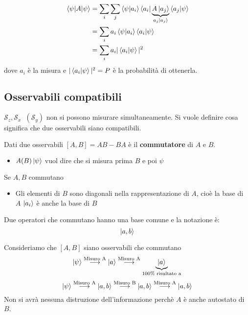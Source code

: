 \documentclass[a4paper]{article}
\begin{document}
\noindent
\[
  \begin{aligned}
    \ev{A}{\psi} &= \sum_i \sum_j \braket{\psi }{a_i} \bra{a_i} \underbrace{A \ket{a_j}}_{a_j \ket{a_j}} 
    \braket{a_j}{\psi }\\
                 &=\sum_i a_i \braket{\psi }{a_i} \braket{a_i}{\psi }\\
                 &=\sum_i a_i |\braket{a_i}{\psi}|^2
  \end{aligned}
\] 
dove \( a_i \) è la misura e \( |\braket{a_i}{\psi}|^2 = P \) è la probabilità di
ottenerla.

\subsection{Osservabili compatibili}
\( \mathcal{S}_z, \mathcal{S}_x \;\; (\mathcal{S}_y) \) non si possono misurare 
simultaneamente. Si vuole definire cosa significa che due osservabili siano compatibili.
\begin{definition}
  Dati due osservabili \( [A,B] = AB - BA \) è il \textbf{commutatore} di \( A \) e \( B \).
  \begin{itemize}
    \item \( A(B) \ket{\psi } \) vuol dire che si misura prima \( B \) e poi \( \psi  \) 
  \end{itemize}
\end{definition}

\begin{theorem}
  Se \( A,B \) commutano
  \begin{itemize}
    \item Gli elementi di \( B \) sono diagonali nella rappresentazione di \( A \),
      cioè la base di \( A \) \( \ket{a_i} \) è anche la base di \( B \)
  \end{itemize}
  Due operatori che commutano hanno una base comune e la notazione è:
  \[
    \ket{a,b}
  \] 
\end{theorem}
\vspace{1em}
\noindent
Consideriamo che \( [A,B] \) siano osservabili che commutano
\[
  \ket{\psi} \stackrel{\text{Misuro A}}{\longrightarrow} \ket{a}
  \stackrel{\text{Misuro A}}{\longrightarrow} \underbrace{\ket{a}}_{100\% \text{ risultato a}}
\] 
\[
  \ket{\psi} \stackrel{\text{Misuro A}}{\longrightarrow} \ket{a,b}
  \stackrel{\text{Misuro B}}{\longrightarrow} \ket{a,b}
  \stackrel{\text{Misuro A}}{\longrightarrow} \ket{a,b}
\] 
Non si avrà nessuna distruzione dell'informazione perchè \( A \) è anche autostato di \( B \).
\end{document}
